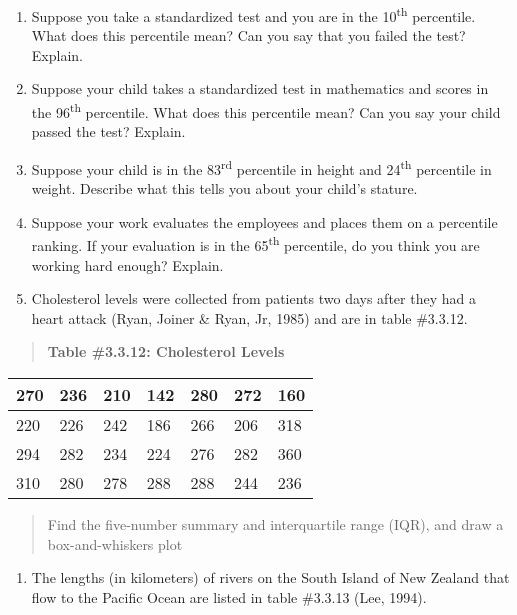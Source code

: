 \documentclass[]{book}
\providecommand{\tightlist}{%
  \setlength{\itemsep}{0pt}\setlength{\parskip}{0pt}}
\begin{document}
\begin{enumerate}
\def\labelenumi{\arabic{enumi}.}
\item
  Suppose you take a standardized test and you are in the 10\textsuperscript{th}
  percentile. What does this percentile mean? Can you say that you
  failed the test? Explain.
\item
  Suppose your child takes a standardized test in mathematics and
  scores in the 96\textsuperscript{th} percentile. What does this percentile mean? Can
  you say your child passed the test? Explain.
\item
  Suppose your child is in the 83\textsuperscript{rd} percentile in height and 24\textsuperscript{th}
  percentile in weight. Describe what this tells you about your
  child's stature.
\item
  Suppose your work evaluates the employees and places them on a
  percentile ranking. If your evaluation is in the 65\textsuperscript{th} percentile,
  do you think you are working hard enough? Explain.
\item
  Cholesterol levels were collected from patients two days after they
  had a heart attack (Ryan, Joiner \& Ryan, Jr, 1985) and are in table
  \#3.3.12.
\end{enumerate}

\begin{quote}
\textbf{Table \#3.3.12: Cholesterol Levels}
\end{quote}

\begin{longtable}[]{@{}lllllll@{}}
\toprule
270 & 236 & 210 & 142 & 280 & 272 & 160\tabularnewline
\midrule
\endhead
220 & 226 & 242 & 186 & 266 & 206 & 318\tabularnewline
294 & 282 & 234 & 224 & 276 & 282 & 360\tabularnewline
310 & 280 & 278 & 288 & 288 & 244 & 236\tabularnewline
\bottomrule
\end{longtable}

\begin{quote}
Find the five-number summary and interquartile range (IQR), and draw a
box-and-whiskers plot
\end{quote}

\begin{enumerate}
\def\labelenumi{\arabic{enumi}.}
\setcounter{enumi}{5}
\tightlist
\item
  The lengths (in kilometers) of rivers on the South Island of New
  Zealand that flow to the Pacific Ocean are listed in table \#3.3.13
  (Lee, 1994).
\end{enumerate}
\end{document}
